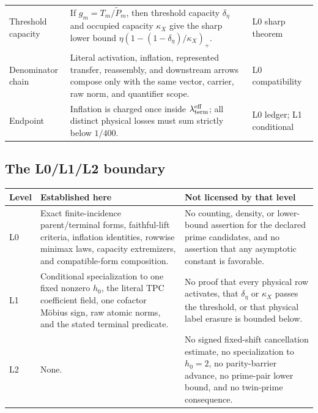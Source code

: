 \begin{center}
\begin{tabular}{>{\raggedright\arraybackslash}p{}
                >{\raggedright\arraybackslash}p{}
                >{\raggedright\arraybackslash}p{}}
Threshold capacity
& If \(g_m=T_m/\widetilde P_m\), then threshold capacity
  \(\delta_\eta\) and occupied capacity \(\kappa_X\) give the sharp lower
  bound
  \(\eta(1-(1-\delta_\eta)/\kappa_X)_+\).
& L0 sharp theorem\\
\addlinespace
Denominator chain
& Literal activation, inflation, represented transfer, reassembly, and
  downstream arrows compose only with the same vector, carrier, raw norm,
  and quantifier scope.
& L0 compatibility\\
\addlinespace
Endpoint
& Inflation is charged once inside
  \(\lambda_{\rm term}^{\rm eff}\); all distinct physical losses must sum
  strictly below \(1/400\).
& L0 ledger; L1 conditional\\
\bottomrule
\end{tabular}
\end{center}

\subsection{The L0/L1/L2 boundary}

\begin{center}
\small
\begin{tabular}{>{\raggedright\arraybackslash}p{}
                >{\raggedright\arraybackslash}p{}
                >{\raggedright\arraybackslash}p{}}
\toprule
Level & Established here & Not licensed by that level\\
\midrule
L0
& Exact finite-incidence parent/terminal forms, faithful-lift criteria,
  inflation identities, rowwise minimax laws, capacity extremizers, and
  compatible-form composition.
& No counting, density, or lower-bound assertion for the declared prime
  candidates, and no assertion that any asymptotic constant is favorable.\\
\addlinespace
L1
& Conditional specialization to one fixed nonzero \(h_0\), the literal
  TPC coefficient field, one cofactor M\"obius sign, raw atomic norms, and
  the stated terminal predicate.
& No proof that every physical row activates, that
  \(\delta_\eta\) or \(\kappa_X\) passes the threshold, or that physical
  label erasure is bounded below.\\
\addlinespace
L2
& None.
& No signed fixed-shift cancellation estimate, no specialization to
  \(h_0=2\), no parity-barrier advance, no prime-pair lower bound, and no
  twin-prime consequence.\\
\bottomrule
\end{tabular}
\end{center}

